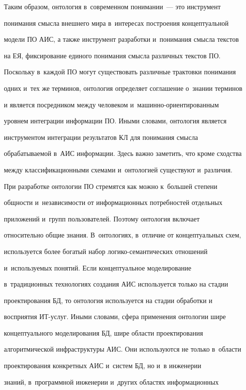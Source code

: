   Таким образом, онтология в~современном понимании~--- это инструмент 


понимания смысла внешнего мира в~интересах построения концептуальной 


модели ПО АИС, а также инструмент разработки и~понимания смысла текстов 


на ЕЯ, фиксирование единого понимания смысла различных текстов ПО. 


Поскольку в~каждой ПО могут существовать различные трактовки понимания 


одних и~тех же терминов, онтология определяет соглашение о~знании терминов 


и является посредником между человеком и~машинно-ориентированным 


уровнем интеграции информации ПО. Иными словами, онтология является 


инструментом интеграции результатов КЛ для понимания смысла 


обрабатываемой в~АИС информации. Здесь важно заметить, что кроме сходства 


между классификационными схемами и~онтологией существуют и~различия. 


При разработке онтологии ПО стремятся как можно к~большей степени 


общности и~независимости от информационных потребностей отдельных 


приложений и~групп пользователей. Поэтому онтология включает 


относительно общие знания. В~онтологиях, в~отличие от концептуальных схем, 


используется более богатый набор логико-семантических отношений 


и~используемых понятий. Если концептуальное моделирование 


в~традиционных технологиях создания АИС используется только на стадии 


проектирования БД, то онтология используется на стадии обработки и~


восприятия ИТ-услуг. Иными словами, сфера применения онтологии шире 


концептуального моделирования БД, шире области проектирования 


алгоритмической инфраструктуры АИС. Они используются не только в~области 


проектирования конкретных АИС и~систем БД, но и~в инженерии 


знаний, в~программной инженерии и~других областях информационных 


